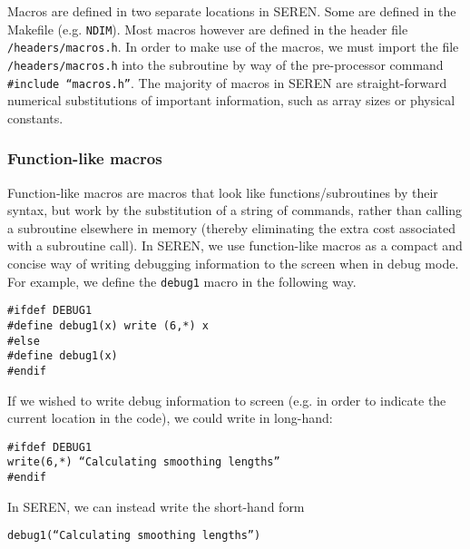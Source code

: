 \documentclass[a4paper]{article}
\newcommand{\var}[1]{\texttt{#1}}
\begin{document}
Macros are defined in two separate locations in SEREN.  Some are defined in the Makefile (e.g. \var{NDIM}). Most macros however are defined in the header file \var{/headers/macros.h}.  In order to make use of the macros, we must import the file \var{/headers/macros.h} into the subroutine by way of the pre-processor command \var{\#include ``macros.h''}.  The majority of macros in SEREN are straight-forward numerical substitutions of important information, such as array sizes or physical constants.



\subsubsection{Function-like macros}
Function-like macros are macros that look like functions/subroutines by their syntax, but work by the substitution of a string of commands, rather than calling a subroutine elsewhere in memory (thereby eliminating the extra cost associated with a subroutine call).  In SEREN, we use function-like macros as a compact and concise way of writing debugging information to the screen when in debug mode.  For example, we define the \var{debug1} macro in the following way. \newline

\noindent \var{\#ifdef DEBUG1} \\
\var{\#define debug1(x)   write (6,*) x} \\
\noindent\var{\#else} \\
\var{\#define debug1(x)} \\
\noindent\var{\#endif} \newline

If we wished to write debug information to screen (e.g. in order to indicate the current location in the code), we could write in long-hand: \newline

\noindent \var{\#ifdef DEBUG1} \\ 
\var{write(6,*) ``Calculating smoothing lengths''} \\ 
\noindent\var{\#endif} \newline

In SEREN, we can instead write the short-hand form
\newline

\noindent \var{debug1(``Calculating smoothing lengths'')}
\newline
\end{document}
